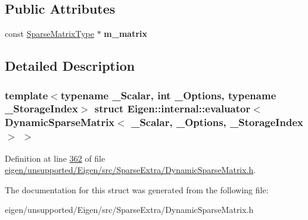 \subsection*{Public Attributes}
\begin{DoxyCompactItemize}
\item 
\mbox{\label{struct_eigen_1_1internal_1_1evaluator_3_01_dynamic_sparse_matrix_3_01___scalar_00_01___options_00_01___storage_index_01_4_01_4_ae467d2312d1ffd107b31c422be547af1}} 
const \hyperlink{class_eigen_1_1_dynamic_sparse_matrix}{Sparse\+Matrix\+Type} $\ast$ {\bfseries m\+\_\+matrix}
\end{DoxyCompactItemize}


\subsection{Detailed Description}
\subsubsection*{template$<$typename \+\_\+\+Scalar, int \+\_\+\+Options, typename \+\_\+\+Storage\+Index$>$\newline
struct Eigen\+::internal\+::evaluator$<$ Dynamic\+Sparse\+Matrix$<$ \+\_\+\+Scalar, \+\_\+\+Options, \+\_\+\+Storage\+Index $>$ $>$}



Definition at line \hyperlink{eigen_2unsupported_2_eigen_2src_2_sparse_extra_2_dynamic_sparse_matrix_8h_source_l00362}{362} of file \hyperlink{eigen_2unsupported_2_eigen_2src_2_sparse_extra_2_dynamic_sparse_matrix_8h_source}{eigen/unsupported/\+Eigen/src/\+Sparse\+Extra/\+Dynamic\+Sparse\+Matrix.\+h}.



The documentation for this struct was generated from the following file\+:\begin{DoxyCompactItemize}
\item 
eigen/unsupported/\+Eigen/src/\+Sparse\+Extra/\+Dynamic\+Sparse\+Matrix.\+h\end{DoxyCompactItemize}

